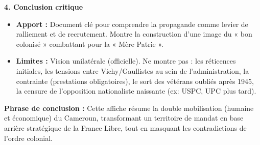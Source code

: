 \documentclass[11pt]{article}
\newcommand{\cle}[1]{{\popxbold\color{popdark}#1}}
\begin{document}
\begin{exoresolu}
\textbf{4. Conclusion critique}
\begin{itemize}
    \item \textbf{Apport :} Document clé pour comprendre la \cle{propagande} comme levier de ralliement et de recrutement. Montre la construction d'une image du « bon colonisé » combattant pour la « Mère Patrie ».
    \item \textbf{Limites :} Vision unilatérale (officielle). Ne montre pas : les réticences initiales, les tensions entre Vichy/Gaullistes au sein de l'administration, la contrainte (prestations obligatoires), le sort des vétérans oubliés après 1945, la censure de l'opposition nationaliste naissante (ex: USPC, UPC plus tard).
\end{itemize}
\textbf{Phrase de conclusion :} Cette affiche résume la double mobilisation (humaine et économique) du Cameroun, transformant un territoire de mandat en base arrière stratégique de la France Libre, tout en masquant les contradictions de l'ordre colonial.
\end{exoresolu}
\end{document}
